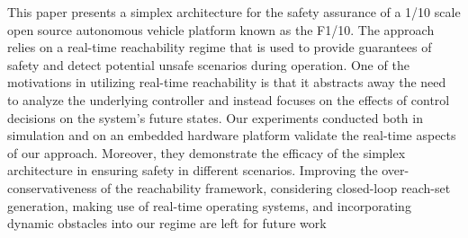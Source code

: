 \documentclass[manuscript,screen,review]{acmart}
\newcommand{\diego}[1]{\textcolor{purple}{\textbf{\underline{DM:}} #1}}
\begin{document}
This paper presents a simplex architecture for the safety assurance of a 1/10 scale open source autonomous vehicle platform known as the F1/10. The approach relies on a real-time reachability regime that is used to provide guarantees of safety and detect potential unsafe scenarios during operation. One of the motivations in utilizing real-time reachability is that it abstracts away the need to analyze the underlying controller and instead focuses on the effects of control decisions on the system's future states. Our experiments conducted both in simulation and on an embedded hardware platform validate the real-time aspects of our approach. Moreover, they demonstrate the efficacy of the simplex architecture in ensuring safety in different scenarios. Improving the over-conservativeness of the reachability framework, considering closed-loop reach-set generation, making use of real-time operating systems, and incorporating dynamic obstacles into our regime are left for future work




\end{document}
